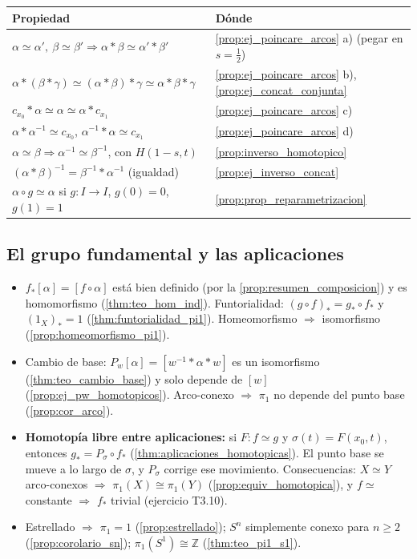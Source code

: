 \begin{center}
\renewcommand{\arraystretch}{1.2}
\begin{tabular}{|p{6.2cm}|p{6.2cm}|}
\hline
\textbf{Propiedad} & \textbf{Dónde} \\ \hline
$\alpha \simeq \alpha',\ \beta \simeq \beta' \Rightarrow \alpha * \beta \simeq \alpha' * \beta'$ & \cref{prop:ej_poincare_arcos} a) (pegar en $s = \frac12$) \\ \hline
$\alpha * (\beta * \gamma) \simeq (\alpha * \beta) * \gamma \simeq \alpha * \beta * \gamma$ & \cref{prop:ej_poincare_arcos} b), \cref{prop:ej_concat_conjunta} \\ \hline
$c_{x_0} * \alpha \simeq \alpha \simeq \alpha * c_{x_1}$ & \cref{prop:ej_poincare_arcos} c) \\ \hline
$\alpha * \alpha^{-1} \simeq c_{x_0}$, $\alpha^{-1} * \alpha \simeq c_{x_1}$ & \cref{prop:ej_poincare_arcos} d) \\ \hline
$\alpha \simeq \beta \Rightarrow \alpha^{-1} \simeq \beta^{-1}$, con $H(1-s,t)$ & \cref{prop:inverso_homotopico} \\ \hline
$(\alpha * \beta)^{-1} = \beta^{-1} * \alpha^{-1}$ (igualdad) & \cref{prop:ej_inverso_concat} \\ \hline
$\alpha \circ g \simeq \alpha$ si $g \colon I \to I$, $g(0) = 0$, $g(1) = 1$ & \cref{prop:prop_reparametrizacion} \\ \hline
\end{tabular}
\end{center}

\subsection{El grupo fundamental y las aplicaciones}

\begin{itemize}
    \item $f_*[\alpha] = [f \circ \alpha]$ está bien definido (por la \cref{prop:resumen_composicion}) y es homomorfismo (\cref{thm:teo_hom_ind}). Funtorialidad: $(g \circ f)_* = g_* \circ f_*$ y $(1_X)_* = 1$ (\cref{thm:funtorialidad_pi1}). Homeomorfismo $\Rightarrow$ isomorfismo (\cref{prop:homeomorfismo_pi1}).
    \item Cambio de base: $P_w[\alpha] = [w^{-1} * \alpha * w]$ es un isomorfismo (\cref{thm:teo_cambio_base}) y solo depende de $[w]$ (\cref{prop:ej_pw_homotopicos}). Arco-conexo $\Rightarrow$ $\pi_1$ no depende del punto base (\cref{prop:cor_arco}).
    \item \textbf{Homotopía libre entre aplicaciones:} si $F \colon f \simeq g$ y $\sigma(t) = F(x_0,t)$, entonces $g_* = P_\sigma \circ f_*$ (\cref{thm:aplicaciones_homotopicas}). El punto base se mueve a lo largo de $\sigma$, y $P_\sigma$ corrige ese movimiento. Consecuencias: $X \simeq Y$ arco-conexos $\Rightarrow$ $\pi_1(X) \cong \pi_1(Y)$ (\cref{prop:equiv_homotopica}), y $f \simeq$ constante $\Rightarrow$ $f_*$ trivial (ejercicio T3.10).
    \item Estrellado $\Rightarrow$ $\pi_1 = 1$ (\cref{prop:estrellado}); $S^n$ simplemente conexo para $n \geq 2$ (\cref{prop:corolario_sn}); $\pi_1(S^1) \cong \mathbb{Z}$ (\cref{thm:teo_pi1_s1}).
\end{itemize}

